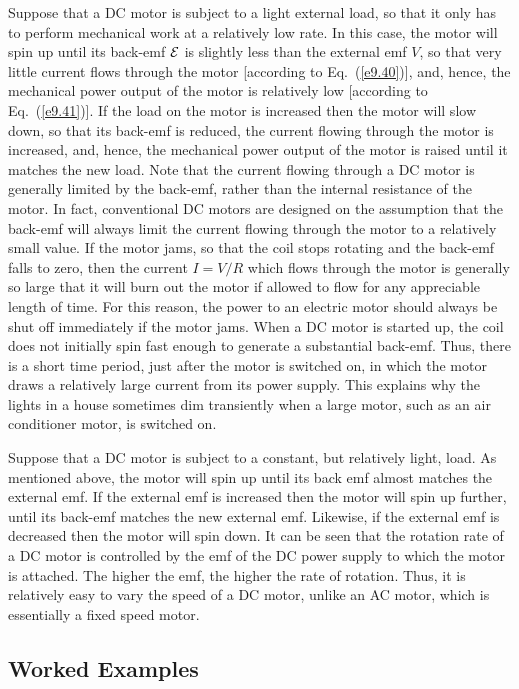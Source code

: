 Suppose that a DC  motor is subject to a  light external load, so that it only
has to perform mechanical work at a relatively low rate. In this case,
the motor will spin up until its back-emf ${\cal E}$ is slightly less
than the external emf $V$, so that very little current flows through the
motor [according to Eq.~(\ref{e9.40})], and, hence, the mechanical 
power output of the motor
is relatively low [according to Eq.~(\ref{e9.41})]. If the load on the motor is
increased then the motor will slow down, so that its 
back-emf is reduced, the current flowing through the motor is increased, and,
hence, the mechanical power output of the motor is raised until
it matches the new load. Note that the current flowing
through a DC motor is generally limited  by the back-emf, rather than the
internal resistance of the motor. In fact, conventional DC motors are designed
on the assumption that the back-emf will always limit  the current flowing through
the motor to a relatively small value. If the motor jams, so that the coil stops
rotating and the back-emf falls to zero, then the current $I=V/R$ which
flows through the motor is generally so large that it will burn out the motor
if allowed to flow for any appreciable length of time. For this reason, 
the  power to an electric motor
should always be shut off immediately if the motor jams. When a DC motor
is started up, the coil does not initially spin fast enough to
generate a substantial back-emf. Thus, there is a short time period,
just after the motor is switched on, in which the motor draws a relatively
large current from its power supply. This explains why the lights 
in a house sometimes
dim transiently when a large motor, such as 
an air conditioner motor, is switched on.

Suppose that a DC motor is subject to a constant, but relatively light, load. 
As mentioned above, the motor will spin up until its back emf almost
matches the external emf. If the external emf is increased then the motor
will spin up further, until its back-emf  matches the new external
emf. Likewise, if the external emf is decreased then the motor will spin down.
It can be seen that
the rotation rate of a DC motor is controlled by the
emf of the DC power supply to which the motor is attached. The higher the emf, the
higher the  rate of rotation. 
Thus, it is relatively easy to vary the speed of a DC motor, unlike an
AC motor, which is essentially a fixed speed motor. 

\subsection{Worked Examples}

